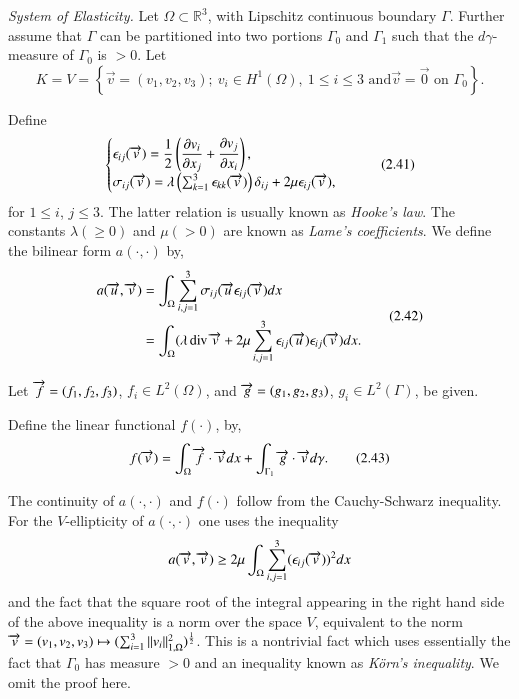 \begin{example}\label{chap2-exam2.3}
{\em System of Elasticity.} Let $\Omega\subset \mathbb{R}^{3}$, with
Lipschitz continuous boundary $\Gamma$. Further assume that $\Gamma$
can be partitioned into two portions $\Gamma_{0}$ and $\Gamma_{1}$
such that the $d\gamma$-measure of $\Gamma_{0}$ is $>0$. Let
$$ 
K=V=\left\{\overrightarrow{v}=(v_{1},v_{2},v_{3});\ v_{i}\in
H^{1}(\Omega),\ 1\leq i\leq 3\text{ and
}\overrightarrow{v}=\overrightarrow{0}\text{ on }\Gamma_{0}\right\}.  
$$ 

Define\pageoriginale
\begin{equation*}
\begin{cases}
\epsilon_{ij}(\overrightarrow{v})=\dfrac{1}{2}\left(\dfrac{\partial v_{i}}{\partial
  x_{j}}+\dfrac{\partial v_{j}}{\partial x_{i}}\right),\\
\sigma_{ij}(\overrightarrow{v})=\lambda\left(\sum^{3}_{k=1}\epsilon_{kk}(\overrightarrow{v})\right)\delta_{ij}+2\mu
\epsilon_{ij}(\overrightarrow{v}), 
\end{cases}\tag{2.41}\label{chap2-eq2.41}
\end{equation*}
for $1\leq i$, $j\leq 3$. The latter relation is usually known as {\em
  Hooke's law}. The constants $\lambda(\geq 0)$ and $\mu(>0)$ are
known as {\em Lame's coefficients}. We define the bilinear form
$a(\cdot,\cdot)$ by,
\begin{equation*}
\begin{split}
a(\overrightarrow{u},\overrightarrow{v}) &=
\int_{\Omega}\sum^{3}_{i,j=1}\sigma_{ij}(\overrightarrow{u}\epsilon_{ij}(\overrightarrow{v})dx\\
&= \int_{\Omega}(\lambda\operatorname{div}
\overrightarrow{v}+2\mu\sum^{3}_{i,j=1}\epsilon_{ij}(\overrightarrow{u})\epsilon_{ij}(\overrightarrow{v})dx. 
\end{split}\tag{2.42}\label{chap2-eq2.42}
\end{equation*}

Let $\overrightarrow{f}=(f_{1},f_{2},f_{3})$, $f_{i}\in L^{2}(\Omega)$, and
$\overrightarrow{g}=(g_{1},g_{2},g_{3})$, $g_{i}\in L^{2}(\Gamma)$, be given.

Define the linear functional $f(\cdot)$, by,
\begin{equation*}
f(\overrightarrow{v})=\int_{\Omega}\overrightarrow{f}\cdot
\overrightarrow{v}dx+\int_{\Gamma_{1}}\overrightarrow{g}\cdot\overrightarrow{v}d\gamma.\tag{2.43}\label{chap2-eq2.43} 
\end{equation*}

The continuity of $a(\cdot,\cdot)$ and $f(\cdot)$ follow from the
Cauchy-Schwarz inequality. For the $V$-ellipticity of $a(\cdot,\cdot)$
one uses the inequality
$$
a(\overrightarrow{v},\overrightarrow{v})\geq
2\mu\int_{\Omega}\sum^{3}_{i,j=1}(\epsilon_{ij}(\overrightarrow{v}))^{2}dx 
$$
and the fact that the square root of the integral appearing in the
right hand side of the above inequality is a norm over the space $V$,
equivalent to the norm $\overrightarrow{v}=(v_{1},v_{2},v_{3})\mapsto
(\sum^{3}_{i=1}||v_{i}||^{2}_{1,\Omega})^{\frac{1}{2}}$. This is a
nontrivial fact which uses essentially the fact that $\Gamma_{0}$ has
measure $>0$ and an inequality known as {\em K\"orn's inequality}. We
omit the proof here.


\end{example}
